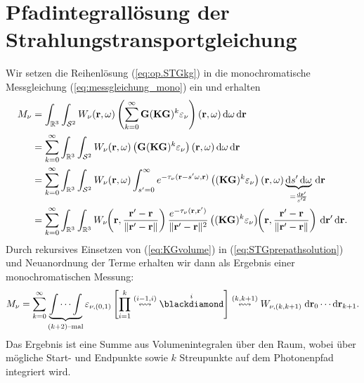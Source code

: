 	\section{Pfadintegrallösung der Strahlungstransportgleichung}
	Wir setzen die Reihenlösung (\ref{eq:op.STGkg}) in die monochromatische Messgleichung (\ref{eq:messgleichung_mono}) ein und erhalten
	\begin{align}
		M_\nu&=\int_{\mathbb{R}^3}\int_{\mathcal{S}^2}W_\nu(\mathbf{r},\omega) \left(\sum_{k=0}^\infty \mathbf{G} (\mathbf{KG})^k \varepsilon_\nu\right)(\mathbf{r},\omega) \,\text{d}\omega \,\text{d}\mathbf{r} \nonumber \\
		&=\sum_{k=0}^\infty \int_{\mathbb{R}^3}\int_{\mathcal{S}^2}W_\nu(\mathbf{r},\omega) \left(\mathbf{G} (\mathbf{KG})^k \varepsilon_\nu\right)(\mathbf{r},\omega) \,\text{d}\omega \,\text{d}\mathbf{r} \nonumber \\
		&=\sum_{k=0}^\infty \int_{\mathbb{R}^3}\int_{\mathcal{S}^2}W_\nu(\mathbf{r},\omega) \int_{s'=0}^\infty e^{-\tau_\nu(\mathbf{r}-s' \omega,\mathbf{r})} \left((\mathbf{KG})^k \varepsilon_\nu\right)(\mathbf{r},\omega) \underbrace{\text{d}s' \,\text{d}\omega}_{=\frac{\text{d}\mathbf{r}'}{s'^2}} \,\text{d}\mathbf{r} \nonumber \\
		&=\sum_{k=0}^\infty \int_{\mathbb{R}^3}\int_{\mathbb{R}^3}W_\nu\hspace{-1 mm}\left(\mathbf{r},\frac{\mathbf{r}'-\mathbf{r}}{\|\mathbf{r}'-\mathbf{r}\|}\right) \frac{e^{-\tau_\nu(\mathbf{r},\mathbf{r}')}}{\|\mathbf{r}'-\mathbf{r}\|^2} \left((\mathbf{KG})^k \varepsilon_\nu\right)\hspace{-1 mm}\left(\mathbf{r},\frac{\mathbf{r}'-\mathbf{r}}{\|\mathbf{r}'-\mathbf{r}\|}\right) \,\text{d}\mathbf{r}' \,\text{d}\mathbf{r}.
		\label{eq:STGprepathsolution}
	\end{align}
	Durch rekursives Einsetzen von (\ref{eq:KGvolume}) in (\ref{eq:STGprepathsolution}) und Neuanordnung der Terme erhalten wir dann als Ergebnis einer monochromatischen Messung:
	\begin{equation}
		M_\nu=\sum_{k=0}^\infty \underbrace{\idotsint}_{(k+2)\text{--mal}}\varepsilon_{\nu,(0,1)}\left[\prod_{i=1}^k\propagate{i-1}{i}\scatter{i}\right]\propagate{k}{k+1} W_{\nu,(k,k+1)} \;\text{d}\location{r}_0 \dotsm \text{d}\location{r}_{k+1} .
		\label{eq:STGpathsolution}
	\end{equation}
	Das Ergebnis ist eine Summe aus Volumenintegralen über den Raum, wobei über mögliche Start- und Endpunkte sowie $k$ Streupunkte auf dem Photonenpfad integriert wird.
